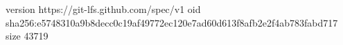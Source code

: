 version https://git-lfs.github.com/spec/v1
oid sha256:e5748310a9b8decc0c19af49772ec120e7ad60d613f8afb2e2f4ab783fabd717
size 43719
